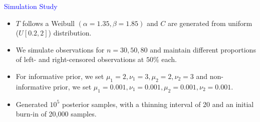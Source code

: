 \documentclass[final]{beamer}
\newlength{\colwidth}
\begin{document}
\begin{frame}[t]
\begin{columns}[t]
\begin{column}{\colwidth}
  \begin{block}{\textcolor{blue}{Simulation Study}}
  \begin{itemize}
      \item $T$ follows a Weibull $(\alpha = 1.35, \beta = 1.85)$ and $C$ are generated from uniform ($U[0.2, 2]$) distribution.
     \item We simulate observations for $n = 30, 50, 80$ and maintain different proportions of left- and right-censored observations at $50\%$ each.   
     \item For informative prior, we set $\mu_1=2, \nu_1=3, \mu_2=2, \nu_2=3$ and non-informative prior, we set $\mu_1=0.001, \nu_1=0.001, \mu_2=0.001, \nu_2=0.001$.  
     \item Generated $10^5$ posterior samples, with a thinning interval of 20 and an initial burn-in of 20,000 samples.
   \end{itemize}


\end{block}
\end{column}
\end{columns}
\end{frame}
\end{document}
